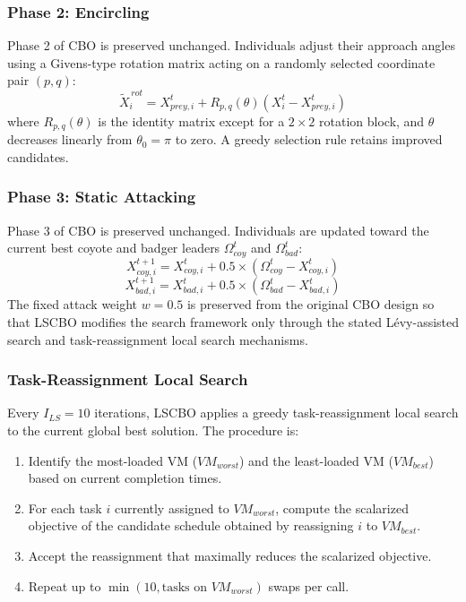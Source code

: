 \documentclass[pdflatex,onecolumn,sn-mathphys-num]{sn-jnl}
\begin{document}
\subsubsection{Phase 2: Encircling}
Phase 2 of CBO is preserved unchanged. Individuals adjust their approach angles using a Givens-type rotation matrix acting on a randomly selected coordinate pair $(p,q)$:
\begin{equation}
\tilde{X}_{i}^{\,rot} = X_{prey, i}^{t} + R_{p,q}(\theta)\left(X_i^t - X_{prey, i}^{t}\right)
\end{equation}
where $R_{p,q}(\theta)$ is the identity matrix except for a $2\times2$ rotation block, and $\theta$ decreases linearly from $\theta_0 = \pi$ to zero. A greedy selection rule retains improved candidates.

\subsubsection{Phase 3: Static Attacking}
Phase 3 of CBO is preserved unchanged. Individuals are updated toward the current best coyote and badger leaders $\Omega_{coy}^{t}$ and $\Omega_{bad}^{t}$:
\begin{equation}
X_{coy, i}^{t+1} = X_{coy, i}^t + 0.5 \times (\Omega_{coy}^{t} - X_{coy, i}^t)
\end{equation}
\begin{equation}
X_{bad, i}^{t+1} = X_{bad, i}^t + 0.5 \times (\Omega_{bad}^{t} - X_{bad, i}^t)
\end{equation}
The fixed attack weight $w=0.5$ is preserved from the original CBO design so that LSCBO modifies the search framework only through the stated L\'{e}vy-assisted search and task-reassignment local search mechanisms.

\subsubsection{Task-Reassignment Local Search}\label{sec:local_search}
Every $I_{LS}=10$ iterations, LSCBO applies a greedy task-reassignment local search to the current global best solution. The procedure is:
\begin{enumerate}
    \item Identify the most-loaded VM ($VM_{worst}$) and the least-loaded VM ($VM_{best}$) based on current completion times.
    \item For each task $i$ currently assigned to $VM_{worst}$, compute the scalarized objective of the candidate schedule obtained by reassigning $i$ to $VM_{best}$.
    \item Accept the reassignment that maximally reduces the scalarized objective.
    \item Repeat up to $\min(10, \text{tasks on } VM_{worst})$ swaps per call.
\end{enumerate}
\end{document}
